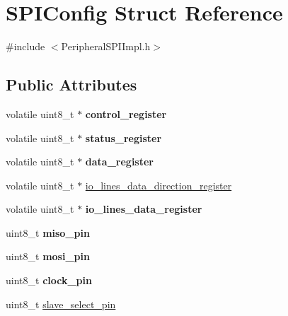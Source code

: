 \hypertarget{structSPIConfig}{}\section{S\+P\+I\+Config Struct Reference}
\label{structSPIConfig}


{\ttfamily \#include $<$Peripheral\+S\+P\+I\+Impl.\+h$>$}

\subsection*{Public Attributes}
\begin{DoxyCompactItemize}
\item 
\mbox{\label{structSPIConfig_aa850d79dc01d13c4363f400ae419e46a}} 
volatile uint8\+\_\+t $\ast$ {\bfseries control\+\_\+register}
\item 
\mbox{\label{structSPIConfig_a63abcab0f5e58f8f3287c008029e0bc6}} 
volatile uint8\+\_\+t $\ast$ {\bfseries status\+\_\+register}
\item 
\mbox{\label{structSPIConfig_adaad72888c23a9acd77da52cab51396e}} 
volatile uint8\+\_\+t $\ast$ {\bfseries data\+\_\+register}
\item 
volatile uint8\+\_\+t $\ast$ \mbox{\hyperlink{structSPIConfig_a47bdd945a9c31fd85bec22639226c2b3}{io\+\_\+lines\+\_\+data\+\_\+direction\+\_\+register}}
\item 
\mbox{\label{structSPIConfig_ada8d5cbb13bb0c13b1d2a4ec1babbfb3}} 
volatile uint8\+\_\+t $\ast$ {\bfseries io\+\_\+lines\+\_\+data\+\_\+register}
\item 
\mbox{\label{structSPIConfig_a6947d3e7b6fc2d1edd24fc77cd6b1b29}} 
uint8\+\_\+t {\bfseries miso\+\_\+pin}
\item 
\mbox{\label{structSPIConfig_a1608f5e137d61b1c677e26e49712fd24}} 
uint8\+\_\+t {\bfseries mosi\+\_\+pin}
\item 
\mbox{\label{structSPIConfig_ad4899f38bba95f9c6754ea57c7500a86}} 
uint8\+\_\+t {\bfseries clock\+\_\+pin}
\item 
uint8\+\_\+t \mbox{\hyperlink{structSPIConfig_a9c74ff0289f0c19aa56fa31def406e05}{slave\+\_\+select\+\_\+pin}}
\end{DoxyCompactItemize}


